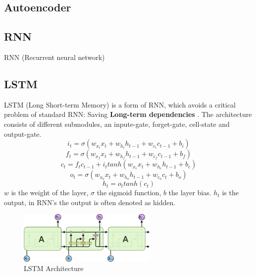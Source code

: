  \subsection{Autoencoder} \label{subsection::autoencoder}

 \subsection{RNN} \label{subsection::rnn}
  RNN (Recurrent neural network)
 
 \subsection{LSTM} \label{subsection::lstm}
  LSTM (Long Short-term Memory) \cite{Hochreiter1997} is a form of RNN, which avoids a critical problem of standard RNN: Saving \textbf{Long-term dependencies} \cite{Goodfellow2016}.
  The architecture consists of different submodules, an inpute-gate, forget-gate, cell-state and output-gate.
  \begin{equation}
   i_t = \sigma(w_{x_i}x_t + w_{h_i}h_{t-1} + w_{c_i}c_{t-1} + b_i)
  \end{equation}
  \begin{equation}
   f_t = \sigma(w_{x_f}x_t + w_{h_f}h_{t-1} + w_{c_f}c_{t-1} + b_f)
  \end{equation}
  \begin{equation}
   c_t = f_tc_{t-1} + i_ttanh(w_{x_c}x_t + w_{h_c}h_{t-1} + b_c)
  \end{equation}
  \begin{equation}
   o_t = \sigma(w_{x_o}x_t + w_{h_o}h_{t-1} + w_{c_o}c_t + b_o)
  \end{equation}
  \begin{equation}
   h_t = o_ttanh(c_t)
  \end{equation}
  $w$ is the weight of the layer, $\sigma$ the sigmoid function, $b$ the layer bias. $h_t$ is the output, in RNN's
  the output is often denoted as hidden.
  \begin{figure}[H]
   \includegraphics[width=0.6\textwidth]{../Images/lstm_chain.png}
   \centering
   \caption{LSTM Architecture \citep{Olah2015}}
   \label{fig:lstm_architecture}
  \end{figure}
 
